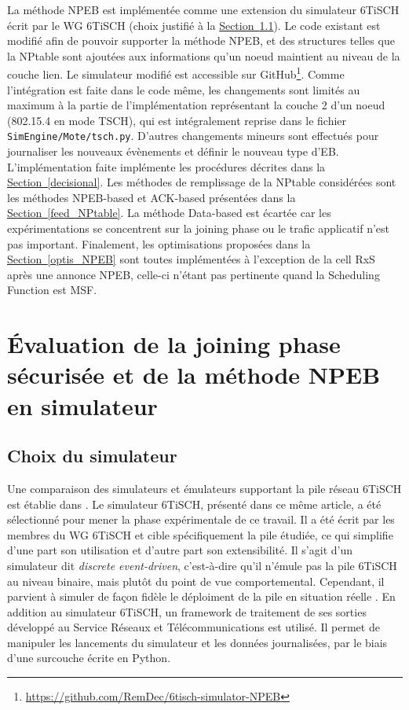\documentclass[]{report}
\newcommand{\wordlink}[2]{\hyperref[#2]{#1~\ref{#2}}}
\begin{document}
La méthode NPEB est implémentée comme une extension du simulateur 6TiSCH écrit par le WG 6TiSCH \cite{simulating-6TiSCH} (choix justifié à la \wordlink{Section}{choice_sim}). Le code existant est modifié afin de pouvoir supporter la méthode NPEB, et des structures telles que la NPtable sont ajoutées aux informations qu'un noeud maintient au niveau de la couche lien. Le simulateur modifié est accessible sur GitHub\footnote{\url{https://github.com/RemDec/6tisch-simulator-NPEB}}. Comme l'intégration est faite dans le code même, les changements sont limités au maximum à la partie de l'implémentation représentant la couche 2 d'un noeud (802.15.4 en mode TSCH), qui est intégralement reprise dans le fichier \texttt{SimEngine/Mote/tsch.py}. D'autres changements mineurs sont effectués pour journaliser les nouveaux évènements et définir le nouveau type d'EB.\\

L'implémentation faite implémente les procédures décrites dans la \wordlink{Section}{decisional}. Les méthodes de remplissage de la NPtable considérées sont les méthodes NPEB-based et ACK-based présentées dans la \wordlink{Section}{feed_NPtable}. La méthode Data-based est écartée car les expérimentations se concentrent sur la joining phase ou le trafic applicatif n'est pas important. Finalement, les optimisations proposées dans la \wordlink{Section}{optis_NPEB} sont toutes implémentées à l'exception de la cell RxS après une annonce NPEB, celle-ci n'étant pas pertinente quand la Scheduling Function est MSF.


\chapter{Évaluation de la joining phase sécurisée et de la méthode NPEB en simulateur}
\label{chap_exp}
\newpage

\section{Choix du simulateur}
\label{choice_sim}

Une comparaison des simulateurs et émulateurs supportant la pile réseau 6TiSCH est établie dans \cite{simulating-6TiSCH}. Le simulateur 6TiSCH, présenté dans ce même article, a été sélectionné pour mener la phase expérimentale de ce travail. Il a été écrit par les membres du WG 6TiSCH et cible spécifiquement la pile étudiée, ce qui simplifie d'une part son utilisation et d'autre part son extensibilité. Il s'agit d'un simulateur dit \textit{discrete event-driven}, c'est-à-dire qu'il n'émule pas la pile 6TiSCH au niveau binaire, mais plutôt du point de vue comportemental. Cependant, il parvient à simuler de façon fidèle le déploiment de la pile en situation réelle \cite{simulating-6TiSCH}. En addition au simulateur 6TiSCH, un framework de traitement de ses sorties développé au Service Réseaux et Télécommunications est utilisé. Il permet de manipuler les lancements du simulateur et les données journalisées, par le biais d'une surcouche écrite en Python.
\end{document}
